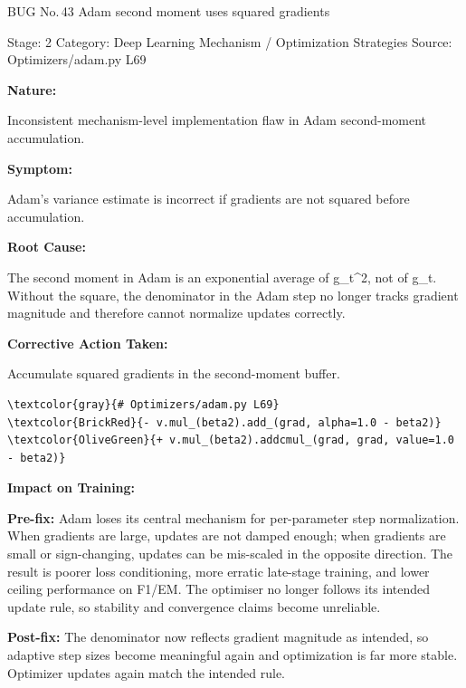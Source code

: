 \documentclass[10pt]{article}
\newcommand{\FieldLabel}[1]{%
 {\bfseries #1:}\par
}
\begin{document}
\begin{bugbox}{BUG No.\,43 \quad Adam second moment uses squared gradients}
{\color{MetaGray}\small Stage: 2 \;\textbar\; Category: Deep Learning Mechanism / Optimization Strategies \;\textbar\; Source: Optimizers/adam.py L69\par}
\vspace{0.22em}
\FieldLabel{Nature}
Inconsistent mechanism-level implementation flaw in Adam second-moment accumulation.
\par
\vspace{0.35em}
\FieldLabel{Symptom}
Adam's variance estimate is incorrect if gradients are not squared before accumulation.
\par
\vspace{0.35em}
\FieldLabel{Root Cause}
The second moment in Adam is an exponential average of g\_t\^{}2, not of g\_t. Without the square, the denominator in the Adam step no longer tracks gradient magnitude and therefore cannot normalize updates correctly.
\par
\vspace{0.35em}
\FieldLabel{Corrective Action Taken}
Accumulate squared gradients in the second-moment buffer.
\par
\vspace{0.35em}
\begin{Verbatim}[commandchars=\\\{\},fontsize=\footnotesize,breaklines=true,breaksymbol={},frame=leftline,framerule=2pt,rulecolor=\color{gray!40},xleftmargin=6pt,formatcom=\singlespacing]
\textcolor{gray}{# Optimizers/adam.py L69}
\textcolor{BrickRed}{- v.mul_(beta2).add_(grad, alpha=1.0 - beta2)}
\textcolor{OliveGreen}{+ v.mul_(beta2).addcmul_(grad, grad, value=1.0 - beta2)}
\end{Verbatim}
\vspace{0.22em}
\FieldLabel{Impact on Training}
\textbf{Pre-fix:} Adam loses its central mechanism for per-parameter step normalization. When gradients are large, updates are not damped enough; when gradients are small or sign-changing, updates can be mis-scaled in the opposite direction. The result is poorer loss conditioning, more erratic late-stage training, and lower ceiling performance on F1/EM. The optimiser no longer follows its intended update rule, so stability and convergence claims become unreliable. \par\smallskip
\textbf{Post-fix:} The denominator now reflects gradient magnitude as intended, so adaptive step sizes become meaningful again and optimization is far more stable. Optimizer updates again match the intended rule. 
\par
\vspace{0.35em}
\end{bugbox}
\end{document}
